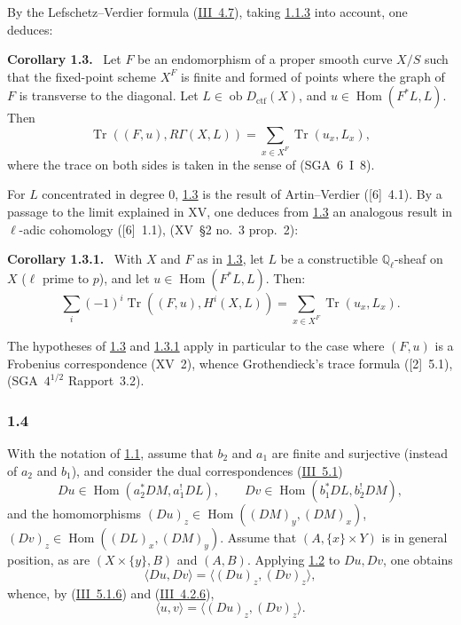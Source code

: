 \documentclass[11pt]{article}
\newenvironment{statement}[1]{\par\medskip\noindent\textbf{#1.}\ }{\par\medskip}
\DeclareMathOperator{\Hom}{Hom}
\newcommand{\ob}{\operatorname{ob}}
\providecommand{\ctf}{\mathrm{ctf}}
\providecommand{\Tr}{\operatorname{Tr}}
\providecommand{\Tr}{\operatorname{Tr}}
\providecommand{\Tr}{\operatorname{Tr}}
\providecommand{\Hom}{\operatorname{Hom}}
\providecommand{\ob}{\operatorname{ob}}
\providecommand{\Tr}{\operatorname{Tr}}
\providecommand{\Hom}{\operatorname{Hom}}
\providecommand{\Tr}{\operatorname{Tr}}
\begin{document}
By the Lefschetz--Verdier formula (\hyperref[sga5:III:corollary:4.7]{III~4.7}), taking \hyperref[sga5:IIIB:subsubsection:1.1.3]{1.1.3} into account, one deduces:

\label{sga5:IIIB:corollary:1.3}\begin{statement}{Corollary 1.3}
Let $F$ be an endomorphism of a proper smooth curve $X/S$ such that the fixed-point scheme $X^F$ is finite and formed of points where the graph of $F$ is transverse to the diagonal. Let $L\in\ob D_{\ctf}(X)$, and $u\in\Hom(F^*L,L)$. Then
\[
\Tr((F,u),R\Gamma(X,L))=\sum_{x\in X^F}\Tr(u_x,L_x),
\]
where the trace on both sides is taken in the sense of (SGA~6~I~8).
\end{statement}

For $L$ concentrated in degree $0$, \hyperref[sga5:IIIB:corollary:1.3]{1.3} is the result of Artin--Verdier ([6]~4.1). By a passage to the limit explained in XV, one deduces from \hyperref[sga5:IIIB:corollary:1.3]{1.3} an analogous result in $\ell$-adic cohomology ([6]~1.1), (XV~\S2 no.~3 prop.~2):

\label{sga5:IIIB:corollary:1.3.1}\begin{statement}{Corollary 1.3.1}
With $X$ and $F$ as in \hyperref[sga5:IIIB:corollary:1.3]{1.3}, let $L$ be a constructible $\mathbb Q_\ell$-sheaf on $X$ ($\ell$ prime to $p$), and let $u\in\Hom(F^*L,L)$. Then:
\[
\sum_i(-1)^i\Tr((F,u),H^i(X,L))=\sum_{x\in X^F}\Tr(u_x,L_x).
\]
\end{statement}

The hypotheses of \hyperref[sga5:IIIB:corollary:1.3]{1.3} and \hyperref[sga5:IIIB:corollary:1.3.1]{1.3.1} apply in particular to the case where $(F,u)$ is a Frobenius correspondence (XV~2), whence Grothendieck's trace formula ([2]~5.1), (SGA~$4^{1/2}$ Rapport~3.2).

\subsubsection*{1.4}\label{sga5:IIIB:subsubsection:1.4}
With the notation of \hyperref[sga5:IIIB:subsubsection:1.1]{1.1}, assume that $b_2$ and $a_1$ are finite and surjective (instead of $a_2$ and $b_1$), and consider the dual correspondences (\hyperref[sga5:III:subsection:5.1]{III~5.1})
\[
Du\in\Hom(a_2^*DM,a_1^!DL),\qquad Dv\in\Hom(b_1^*DL,b_2^!DM),
\]
and the homomorphisms $(Du)_z\in\Hom((DM)_y,(DM)_x)$, $(Dv)_z\in\Hom((DL)_x,(DM)_y)$. Assume that $(A,\{x\}\times Y)$ is in general position, as are $(X\times\{y\},B)$ and $(A,B)$. Applying \hyperref[sga5:IIIB:theorem:1.2]{1.2} to $Du,Dv$, one obtains
\[
\langle Du,Dv\rangle=\langle (Du)_z,(Dv)_z\rangle,
\]
whence, by (\hyperref[sga5:III:equation:5.1.6]{III~5.1.6}) and (\hyperref[sga5:III:equation:4.2.6]{III~4.2.6}),
\begin{equation}\tag{1.4.1}\label{sga5:IIIB:equation:1.4.1}
\langle u,v\rangle=\langle (Du)_z,(Dv)_z\rangle.
\end{equation}
\end{document}
